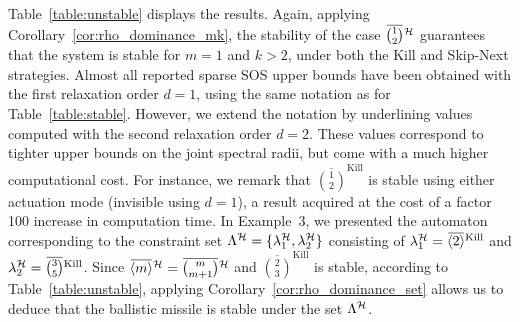Table~\ref{table:unstable} displays the results.
Again, applying Corollary~\ref{cor:rho_dominance_mk}, the stability of the case $\overbar{\binom{1}{2}}^{\strat}$ guarantees that the system is stable for $m=1$ and $k>2$, under both the Kill and Skip-Next strategies.
Almost all reported sparse SOS upper bounds have been obtained with the first relaxation order $d=1$, using the same notation as for Table~\ref{table:stable}.
However, we extend the notation by underlining values computed with the second relaxation order $d=2$.
These values correspond to tighter upper bounds on the joint spectral radii, but come with a much higher computational cost.
For instance, we remark that $\overbar{\binom{1}{2}}^{\text{Kill}}$ is stable using either actuation mode (invisible using $d=1$), a result acquired at the cost of a factor 100 increase in computation time.
%
In Example~$3$, we presented the automaton corresponding to the constraint set $\Lambda^{\mathcal{H}} = \{ \lambda^{\mathcal{H}}_1, \lambda^{\mathcal{H}}_2 \}$ consisting of $\lambda^{\strat}_1 = \overbar{\left<2\right>}^{\text{Kill}}$ and $\lambda^{\strat}_2 = \overbar{\binom{3}{5}}^{\text{Kill}}$.
Since $\overbar{\left<m\right>}^{\strat} = \overbar{\binom{m}{m+1}}^{\strat}$ and $\overbar{\binom{2}{3}}^{\text{Kill}}$ is stable, according to Table~\ref{table:unstable}, applying Corollary~\ref{cor:rho_dominance_set} allows us to deduce that the ballistic missile is stable under the \ewhc{} set $\Lambda^{\mathcal{H}}$.
